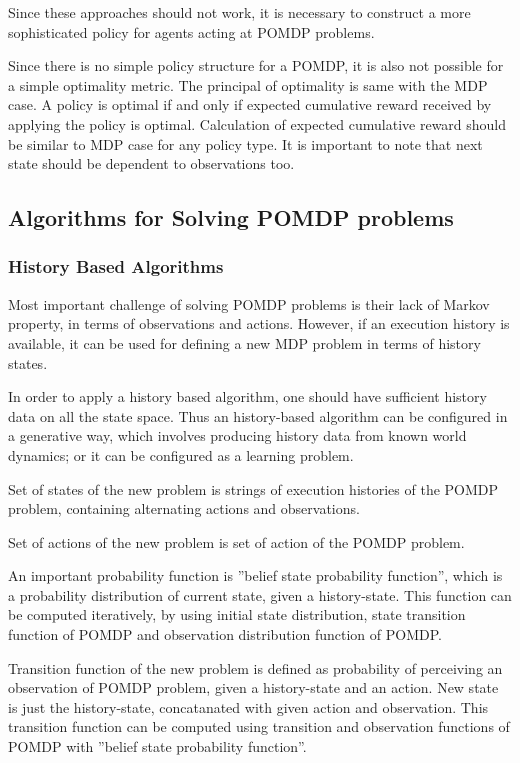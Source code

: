 Since these approaches should not work, it is necessary to construct a more sophisticated policy for agents acting at POMDP problems.

Since there is no simple policy structure for a POMDP, it is also not possible for a simple optimality metric. The principal of optimality is same with the MDP case. A policy is optimal if and only if expected cumulative reward received by applying the policy is optimal. Calculation of expected cumulative reward should be similar to MDP case for any policy type. It is important to note that next state should be dependent to observations too.

\subsection{Algorithms for Solving POMDP problems}

\subsubsection{History Based Algorithms}

Most important challenge of solving POMDP problems is their lack of Markov property, in terms of observations and actions. However, if an execution history is available, it can be used for defining a new MDP problem in terms of history states.

In order to apply a history based algorithm, one should have sufficient history data on all the state space. Thus an history-based algorithm can be configured in a generative way, which involves producing history data from known world dynamics; or it can be configured as a learning problem.

Set of states of the new problem is strings of execution histories of the POMDP problem, containing alternating actions and observations.

Set of actions of the new problem is set of action of the POMDP problem.

An important probability function is ''belief state probability function'', which is a probability distribution of current state, given a history-state. This function can be computed iteratively, by using initial state distribution, state transition function of POMDP and observation distribution function of POMDP.

Transition function of the new problem is defined as probability of perceiving an observation of POMDP problem, given a history-state and an action. New state is just the history-state, concatanated with given action and observation. This transition function can be computed using transition and observation functions of POMDP with ''belief state probability function''.

